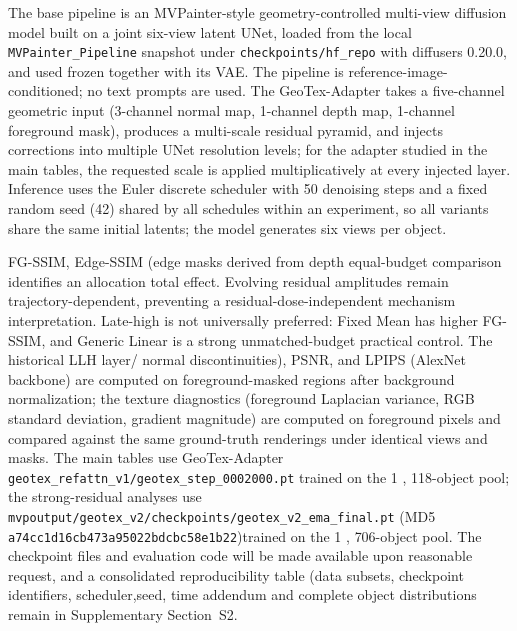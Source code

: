 \documentclass[times,twocolumn,final]{elsarticle}
\providecommand{\DIFadd}[1]{{\protect\color{blue} \sf #1}} %
\providecommand{\DIFdel}[1]{{\protect\color{red} \scriptsize #1}} %
\providecommand{\DIFaddbegin}{} %
\providecommand{\DIFaddend}{} %
\providecommand{\DIFdelbegin}{} %
\providecommand{\DIFdelend}{} %
\begin{document}
The \DIFdelbegin \DIFdel{base pipeline is an MVPainter-style geometry-controlled multi-view diffusion model built on a joint six-view latent UNet, loaded from the local \texttt{MVPainter\_Pipeline} snapshot under \texttt{checkpoints/hf\_repo} with diffusers 0.20.0, and used frozen together with its VAE. The pipeline is reference-image-conditioned; no text prompts are used. The GeoTex-Adapter takes a five-channel geometric input (3-channel normal map, 1-channel depth map, 1-channel foreground mask), produces a multi-scale residual pyramid, and injects corrections into multiple UNet resolution levels; for the adapter studied in the main tables, the requested scale is applied multiplicatively at every injected layer.
Inference uses the Euler discrete scheduler with 50 denoising steps and a fixed random seed (42) shared by all schedules within an experiment, so all variants share the same initial latents; the model generates six views per object.
}%

\DIFdel{FG-SSIM, Edge-SSIM (edge masks derived from depth}\DIFdelend \DIFaddbegin \DIFadd{equal-budget comparison identifies an allocation total effect. Evolving residual amplitudes remain trajectory-dependent, preventing a residual-dose-independent mechanism interpretation. Late-high is not universally preferred: Fixed Mean has higher FG-SSIM, and Generic Linear is a strong unmatched-budget practical control. The historical LLH layer}\DIFaddend /\DIFdelbegin \DIFdel{normal discontinuities), PSNR, and LPIPS (AlexNet backbone) are computed on foreground-masked regions after background normalization; the texture diagnostics (foreground Laplacian variance, RGB standard deviation, gradient magnitude) are computed on foreground pixels and compared against the same ground-truth renderings under identical views and masks. The main tables use GeoTex-Adapter \texttt{geotex\_refattn\_v1/geotex\_step\_0002000.pt} trained on the 1}%
\DIFdel{,}%
\DIFdel{118-object pool; the strong-residual analyses use \texttt{mvpoutput/geotex\_v2/checkpoints/geotex\_v2\_ema\_final.pt} (MD5 \texttt{a74cc1d16cb473a95022bdcbc58e1b22})trained on the 1}%
\DIFdel{,}%
\DIFdel{706-object pool. The checkpoint files and evaluation code will be made available upon reasonable request, and a consolidated reproducibility table (data subsets, checkpoint identifiers, scheduler,seed, }\DIFdelend \DIFaddbegin \DIFadd{time addendum and complete object distributions remain in Supplementary Section~S2.
}
\end{document}
